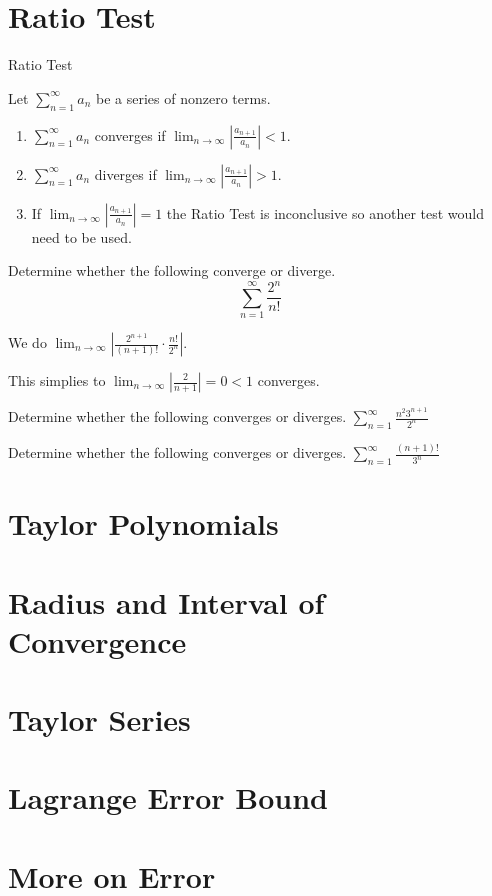 \documentclass[../bccalc.tex]{subfiles}
\begin{document}
\section{Ratio Test}
Ratio Test 

Let $\sum_{n=1}^{\infty}a_n$ be a series of nonzero terms.
\begin{enumerate}
    \item $\sum_{n=1}^{\infty}a_n$ converges if $\lim_{n\to\infty}\left|\frac{a_{n+1}}{a_n}\right|<1$.
    \item $\sum_{n=1}^{\infty}a_n$ diverges if $\lim_{n\to\infty}\left|\frac{a_{n+1}}{a_n}\right|>1$.
    \item If $\lim_{n\to\infty}\left|\frac{a_{n+1}}{a_n}\right|=1$ the Ratio Test is inconclusive so another test would need to be used.
\end{enumerate}

\begin{example}
    Determine whether the following converge or diverge.
    \[ \sum_{n=1}^{\infty}\frac{2^n}{n!} \]

    We do $\lim_{n\to\infty}\left| \frac{2^{n+1}}{(n+1)!}\cdot \frac{n!}{2^n} \right|$.

    This simplies to $\lim_{n\to\infty}\left|\frac{2}{n+1}\right|=0<1$ converges.
\end{example}

\ex Determine whether the following converges or diverges. $\sum_{n=1}^{\infty}\frac{n^2 3^{n+1}}{2^n}$

\ex Determine whether the following converges or diverges. $\sum_{n=1}^{\infty}\frac{(n+1)!}{3^n}$

\section{Taylor Polynomials}

\section{Radius and Interval of Convergence}

\section{Taylor Series}

\section{Lagrange Error Bound}

\section{More on Error}
\end{document}
